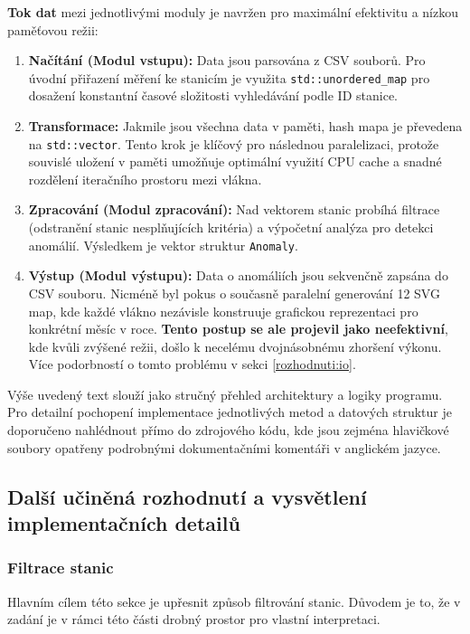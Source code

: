 \documentclass[10pt, a4paper]{report}
\begin{document}
	\textbf{Tok dat} mezi jednotlivými moduly je navržen pro maximální efektivitu a nízkou paměťovou režii:
	\begin{enumerate}
		\item \textbf{Načítání (Modul vstupu):} Data jsou parsována z CSV souborů. Pro úvodní přiřazení měření ke stanicím je využita \texttt{std::unordered\_map} pro dosažení konstantní časové složitosti vyhledávání podle ID stanice.
		\item \textbf{Transformace:} Jakmile jsou všechna data v paměti, hash mapa je převedena na \texttt{std::vector}. Tento krok je klíčový pro následnou paralelizaci, protože souvislé uložení v paměti umožňuje optimální využití CPU cache a snadné rozdělení iteračního prostoru mezi vlákna.
		\item \textbf{Zpracování (Modul zpracování):} Nad vektorem stanic probíhá filtrace (odstranění stanic nesplňujících kritéria) a výpočetní analýza pro detekci anomálií. Výsledkem je vektor struktur \texttt{Anomaly}.
		\item \textbf{Výstup (Modul výstupu):} Data o anomáliích jsou sekvenčně zapsána do CSV souboru. Nicméně byl pokus o současně paralelní generování 12 SVG map, kde každé vlákno nezávisle konstruuje grafickou reprezentaci pro konkrétní měsíc v roce. \textbf{Tento postup se ale projevil jako neefektivní}, kde kvůli zvýšené režii, došlo k necelému dvojnásobnému zhoršení výkonu. Více podorbností o tomto problému v sekci \ref{rozhodnuti:io}.
	\end{enumerate}
	
	Výše uvedený text slouží jako stručný přehled architektury a logiky programu. Pro detailní pochopení implementace jednotlivých metod a datových struktur je doporučeno nahlédnout přímo do zdrojového kódu, kde jsou zejména hlavičkové soubory opatřeny podrobnými dokumentačními komentáři v anglickém jazyce.
	
	\subsection{Další učiněná rozhodnutí a vysvětlení implementačních detailů}
	
	\subsubsection{Filtrace stanic}
	
	Hlavním cílem této sekce je upřesnit způsob filtrování stanic. Důvodem je to, že v zadání je v rámci této části drobný prostor pro vlastní interpretaci. 
	
\end{document}
